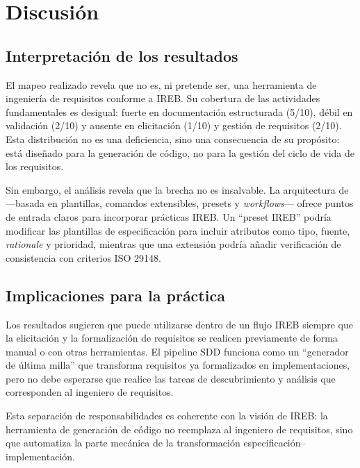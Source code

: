 \section{Discusi\'on}
\label{sec:discusion}

\subsection{Interpretaci\'on de los resultados}

El mapeo realizado revela que \speckit{} no es, ni pretende ser, una herramienta de ingenier\'ia de requisitos conforme a IREB. Su cobertura de las actividades fundamentales es desigual: fuerte en documentaci\'on estructurada (5/10), d\'ebil en validaci\'on (2/10) y ausente en elicitaci\'on (1/10) y gesti\'on de requisitos (2/10). Esta distribuci\'on no es una deficiencia, sino una consecuencia de su prop\'osito: \speckit{} est\'a dise\~nado para la generaci\'on de c\'odigo, no para la gesti\'on del ciclo de vida de los requisitos.

Sin embargo, el an\'alisis revela que la brecha no es insalvable. La arquitectura de \speckit{} ---basada en plantillas, comandos extensibles, presets y \emph{workflows}--- ofrece puntos de entrada claros para incorporar pr\'acticas IREB. Un ``preset IREB'' podr\'ia modificar las plantillas de especificaci\'on para incluir atributos como tipo, fuente, \emph{rationale} y prioridad, mientras que una extensi\'on podr\'ia a\~nadir verificaci\'on de consistencia con criterios ISO 29148.

\subsection{Implicaciones para la pr\'actica}

Los resultados sugieren que \speckit{} puede utilizarse dentro de un flujo IREB siempre que la elicitaci\'on y la formalizaci\'on de requisitos se realicen previamente de forma manual o con otras herramientas. El pipeline SDD funciona como un ``generador de \'ultima milla'' que transforma requisitos ya formalizados en implementaciones, pero no debe esperarse que realice las tareas de descubrimiento y an\'alisis que corresponden al ingeniero de requisitos.

Esta separaci\'on de responsabilidades es coherente con la visi\'on de IREB: la herramienta de generaci\'on de c\'odigo no reemplaza al ingeniero de requisitos, sino que automatiza la parte mec\'anica de la transformaci\'on especificaci\'on--implementaci\'on.

